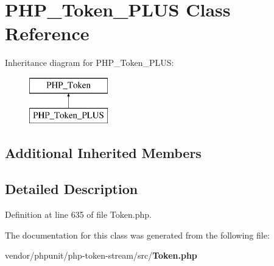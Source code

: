 \section{P\+H\+P\+\_\+\+Token\+\_\+\+P\+L\+U\+S Class Reference}
\label{class_p_h_p___token___p_l_u_s}
Inheritance diagram for P\+H\+P\+\_\+\+Token\+\_\+\+P\+L\+U\+S\+:\begin{figure}[H]
\begin{center}
\leavevmode
\includegraphics[height=2.000000cm]{class_p_h_p___token___p_l_u_s}
\end{center}
\end{figure}
\subsection*{Additional Inherited Members}


\subsection{Detailed Description}


Definition at line 635 of file Token.\+php.



The documentation for this class was generated from the following file\+:\begin{DoxyCompactItemize}
\item 
vendor/phpunit/php-\/token-\/stream/src/{\bf Token.\+php}\end{DoxyCompactItemize}
